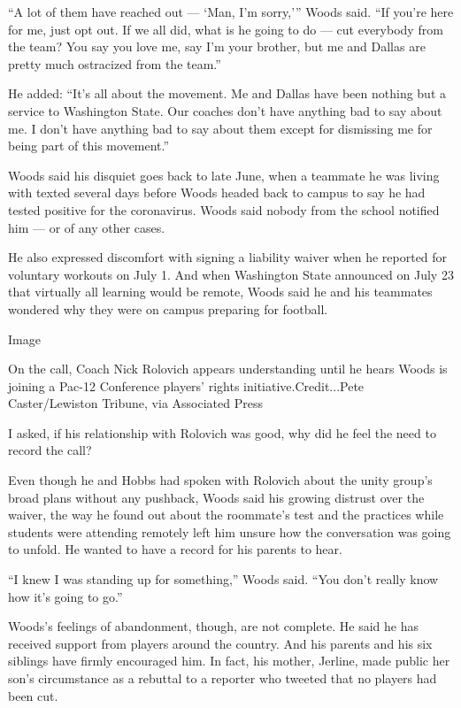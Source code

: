 ``A lot of them have reached out --- `Man, I'm sorry,''' Woods said.
``If you're here for me, just opt out. If we all did, what is he going
to do --- cut everybody from the team? You say you love me, say I'm your
brother, but me and Dallas are pretty much ostracized from the team.''

He added: ``It's all about the movement. Me and Dallas have been nothing
but a service to Washington State. Our coaches don't have anything bad
to say about me. I don't have anything bad to say about them except for
dismissing me for being part of this movement.''

Woods said his disquiet goes back to late June, when a teammate he was
living with texted several days before Woods headed back to campus to
say he had tested positive for the coronavirus. Woods said nobody from
the school notified him --- or of any other cases.

He also expressed discomfort with signing a liability waiver when he
reported for voluntary workouts on July 1. And when Washington State
announced on July 23 that virtually all learning would be remote, Woods
said he and his teammates wondered why they were on campus preparing for
football.

Image

On the call, Coach Nick Rolovich appears understanding until he hears
Woods is joining a Pac-12 Conference players' rights
initiative.Credit...Pete Caster/Lewiston Tribune, via Associated Press

I asked, if his relationship with Rolovich was good, why did he feel the
need to record the call?

Even though he and Hobbs had spoken with Rolovich about the unity
group's broad plans without any pushback, Woods said his growing
distrust over the waiver, the way he found out about the roommate's test
and the practices while students were attending remotely left him unsure
how the conversation was going to unfold. He wanted to have a record for
his parents to hear.

``I knew I was standing up for something,'' Woods said. ``You don't
really know how it's going to go.''

Woods's feelings of abandonment, though, are not complete. He said he
has received support from players around the country. And his parents
and his six siblings have firmly encouraged him. In fact, his mother,
Jerline, made public her son's circumstance as a rebuttal to a reporter
who tweeted that no players had been cut.


